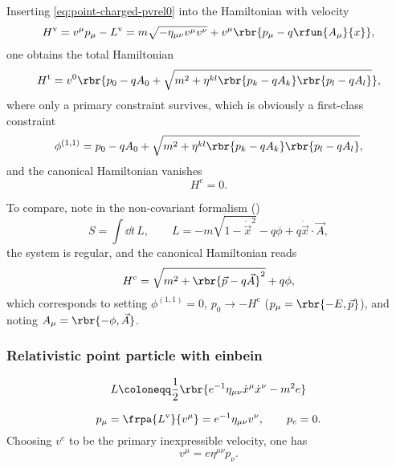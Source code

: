 \documentclass[a4paper,11pt]{article}
\begin{document}
Inserting \cref{eq:point-charged-pvrel0} into the Hamiltonian with velocity
\begin{equation}
H^\text{v} = v^\mu p_\mu - L^\text{v} = m\sqrt{-\eta_{\mu\nu}v^\mu v^\nu} + 
v^\mu\rbr{p_\mu - q \rfun{A_\mu}{x}},
\end{equation}
one obtains the total Hamiltonian
\begin{equation}
H^\text{t} = v^0 \rbr{p_0 - q A_0 + \sqrt{m^2 + \eta^{kl}
\rbr{p_k - q A_k}\rbr{p_l - q A_l}}},
\end{equation}
where only a primary constraint survives, which is obviously a first-class 
constraint
\begin{equation}
\phi^{(1,1)} = p_0 - q A_0 + \sqrt{m^2 + \eta^{kl}
\rbr{p_k - q A_k}\rbr{p_l - q A_l}},
\end{equation}
and the canonical Hamiltonian vanishes
\begin{equation}
H^\text{c} = 0.
\end{equation}

To compare, note in the non-covariant formalism (\cite[sec.\ 8]{Landau1975})
\begin{equation}
S = \int \dd t\,L,\qquad L = -m\sqrt{1-\dot{\vec{x}}^2} - q \phi +
q \dot{\vec{x}} \cdot \vec{A},
\end{equation}
the system is regular, and the canonical Hamiltonian reads
\begin{equation}
H^\text{c} = \sqrt{m^2 + \rbr{\vec{p}-q\vec{A}}^2} + q\phi,
\end{equation}
which corresponds to setting $\phi^{(1,1)} = 0$, $p_0 \to -H^\text{c}$ 
($p_\mu = \rbr{-E, \vec{p}}$), and noting $A_\mu = \rbr{-\phi, \vec{A}}$.

\subsubsection*{Relativistic point particle with einbein}

\cite[sec.\ 2.1]{Blumenhagen2013}
\begin{equation}
L \coloneqq \frac{1}{2} \rbr{e^{-1}\eta_{\mu\nu}\dot{x}^\mu \dot{x}^\nu - m^2 e}
\label{eq:point-aux-lagrangian}
\end{equation}

\begin{equation}
p_\mu = \frpa{L^\text{v}}{v^\mu} = e^{-1}\eta_{\mu\nu}v^\nu, \qquad
p_e = 0.
\end{equation}
Choosing $v^e$ to be the primary inexpressible velocity, one has
\begin{equation}
v^\mu = e\eta^{\mu\nu}p_\nu.
\end{equation}
\end{document}
